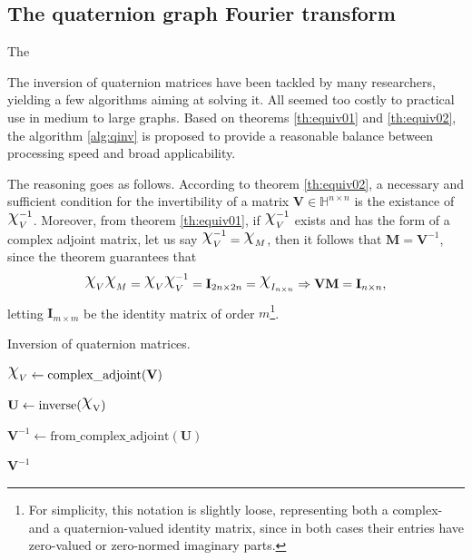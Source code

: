 \subsection{The quaternion graph Fourier transform}
The 

The inversion of quaternion matrices have been tackled by many researchers, yielding a few algorithms aiming at solving it.  All seemed too costly to practical use in medium to large graphs. Based on theorems \ref{th:equiv01} and \ref{th:equiv02},
the algorithm \ref{alg:qinv} is proposed to provide a reasonable balance between processing speed and broad applicability.

The reasoning goes as follows. According to theorem \ref{th:equiv02}, a necessary and sufficient condition for the invertibility of a matrix $\mathbf{V} \in \mathbb{H}^{n \times n}$ is the existance of $\rchi^{-1}_{V}$. Moreover, from theorem \ref{th:equiv01}, if $\rchi^{-1}_{V}$ exists and has the form of a complex adjoint matrix, let us say $\rchi_{V}^{-1} = \rchi_{M}$, then it follows that $\mathbf{M} = \mathbf{V}^{-1}$, since the theorem guarantees that
\begin{equation}
\rchi_{V} \rchi_{M} = \rchi_{V} \rchi_{V}^{-1} = \mathbf{I}_{2n \times 2n} = \rchi_{I_{n \times n}}
\Rightarrow \mathbf{V} \mathbf{M} = \mathbf{I}_{n \times n},
\end{equation}
letting $\mathbf{I}_{m \times m}$ be the identity matrix of order $m$\footnote{For simplicity, this notation is slightly loose, representing both a complex- and a quaternion-valued identity matrix, since in both cases their entries have zero-valued or zero-normed imaginary parts.}.

\begin{center}
\begin{algorithm}
\caption{Inversion of quaternion matrices.}\label{alg:qinv}
$\rchi_{V} \gets \mathrm{complex\_adjoint(\mathbf{V})}$\;


$\mathbf{U} \gets \mathrm{inverse(\rchi_{V})}$


$\mathbf{V}^{-1} \gets \mathrm{from\_complex\_adjoint}(\mathbf{U})$

\Return $\mathbf{V}^{-1}$
\end{algorithm}
\end{center}

